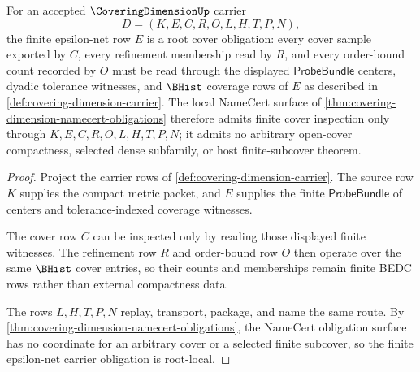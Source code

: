 \begin{theorem}
\label{thm:coveringdimension-finite-epsilon-net-carrier}
For an accepted $\CoveringDimensionUp$ carrier
$$
D=(K,E,C,R,O,L,H,T,P,N),
$$
the finite epsilon-net row $E$ is a root cover obligation: every cover sample exported by $C$, every refinement membership read by $R$, and every order-bound count recorded by $O$ must be read through the displayed $\mathsf{ProbeBundle}$ centers, dyadic tolerance witnesses, and $\BHist$ coverage rows of $E$ as described in \autoref{def:covering-dimension-carrier}. The local NameCert surface of \autoref{thm:covering-dimension-namecert-obligations} therefore admits finite cover inspection only through $K,E,C,R,O,L,H,T,P,N$; it admits no arbitrary open-cover compactness, selected dense subfamily, or host finite-subcover theorem.
\end{theorem}
\begin{proof}
Project the carrier rows of \autoref{def:covering-dimension-carrier}. The source row $K$ supplies the compact metric packet, and $E$ supplies the finite $\mathsf{ProbeBundle}$ of centers and tolerance-indexed coverage witnesses.

The cover row $C$ can be inspected only by reading those displayed finite witnesses. The refinement row $R$ and order-bound row $O$ then operate over the same $\BHist$ cover entries, so their counts and memberships remain finite BEDC rows rather than external compactness data.

The rows $L,H,T,P,N$ replay, transport, package, and name the same route. By \autoref{thm:covering-dimension-namecert-obligations}, the NameCert obligation surface has no coordinate for an arbitrary cover or a selected finite subcover, so the finite epsilon-net carrier obligation is root-local.
\end{proof}

